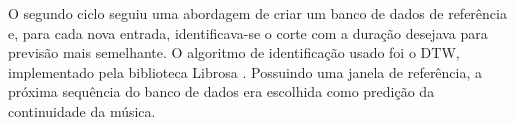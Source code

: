O segundo ciclo seguiu uma abordagem de criar um banco de dados de referência e, para cada nova entrada, identificava-se o corte com a duração desejava para previsão mais semelhante. O algoritmo de identificação usado foi o DTW, implementado pela biblioteca Librosa \cite{librosa}. Possuindo uma janela de referência, a próxima sequência do banco de dados era escolhida como predição da continuidade da música.
